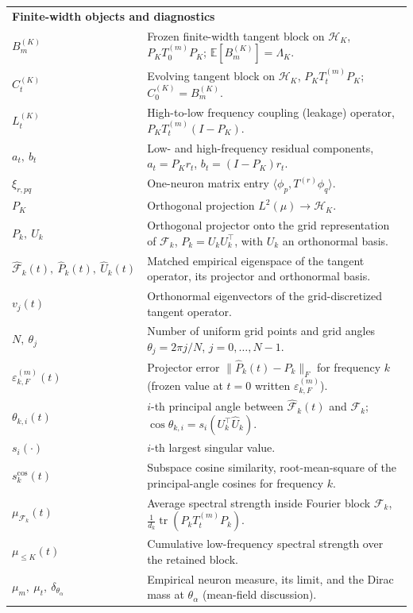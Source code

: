 \begin{longtable}{p{} p{}}
\multicolumn{2}{l}{\textbf{Finite-width objects and diagnostics}}\\[0.3em]
$B_m^{(K)}$ & Frozen finite-width tangent block on $\mathcal{H}_K$, $P_K T_0^{(m)} P_K$; $\mathbb{E}[B_m^{(K)}]=\Lambda_K$. \\[0.4em]
$C_t^{(K)}$ & Evolving tangent block on $\mathcal{H}_K$, $P_K T_t^{(m)} P_K$; $C_0^{(K)}=B_m^{(K)}$. \\[0.4em]
$L_t^{(K)}$ & High-to-low frequency coupling (leakage) operator, $P_K T_t^{(m)}(I-P_K)$. \\[0.4em]
$a_t,\ b_t$ & Low- and high-frequency residual components, $a_t=P_K r_t$, $b_t=(I-P_K)r_t$. \\[0.4em]
$\xi_{r,pq}$ & One-neuron matrix entry $\langle\phi_p, T^{(r)}\phi_q\rangle$. \\[0.4em]
$P_K$ & Orthogonal projection $L^2(\mu)\to\mathcal{H}_K$. \\[0.4em]
$P_k,\ U_k$ & Orthogonal projector onto the grid representation of $\mathcal{F}_k$, $P_k=U_kU_k^\top$, with $U_k$ an orthonormal basis. \\[0.4em]
$\widehat{\mathcal{F}}_k(t),\ \widehat P_k(t),\ \widehat U_k(t)$ & Matched empirical eigenspace of the tangent operator, its projector and orthonormal basis. \\[0.4em]
$v_j(t)$ & Orthonormal eigenvectors of the grid-discretized tangent operator. \\[0.4em]
$N,\ \theta_j$ & Number of uniform grid points and grid angles $\theta_j=2\pi j/N$, $j=0,\dots,N-1$. \\[0.4em]
$\varepsilon_{k,F}^{(m)}(t)$ & Projector error $\|\widehat P_k(t)-P_k\|_F$ for frequency $k$ (frozen value at $t=0$ written $\varepsilon_{k,F}^{(m)}$). \\[0.4em]
$\theta_{k,i}(t)$ & $i$-th principal angle between $\widehat{\mathcal{F}}_k(t)$ and $\mathcal{F}_k$; $\cos\theta_{k,i}=s_i(U_k^\top\widehat U_k)$. \\[0.4em]
$s_i(\cdot)$ & $i$-th largest singular value. \\[0.4em]
$s_k^{\mathrm{cos}}(t)$ & Subspace cosine similarity, root-mean-square of the principal-angle cosines for frequency $k$. \\[0.4em]
$\mu_{\mathcal{F}_k}(t)$ & Average spectral strength inside Fourier block $\mathcal{F}_k$, $\tfrac{1}{d_k}\operatorname{tr}(P_k T_t^{(m)} P_k)$. \\[0.4em]
$\mu_{\le K}(t)$ & Cumulative low-frequency spectral strength over the retained block. \\[0.4em]
$\mu_m,\ \mu_t,\ \delta_{\theta_\alpha}$ & Empirical neuron measure, its limit, and the Dirac mass at $\theta_\alpha$ (mean-field discussion). \\[0.6em]


\end{longtable}
